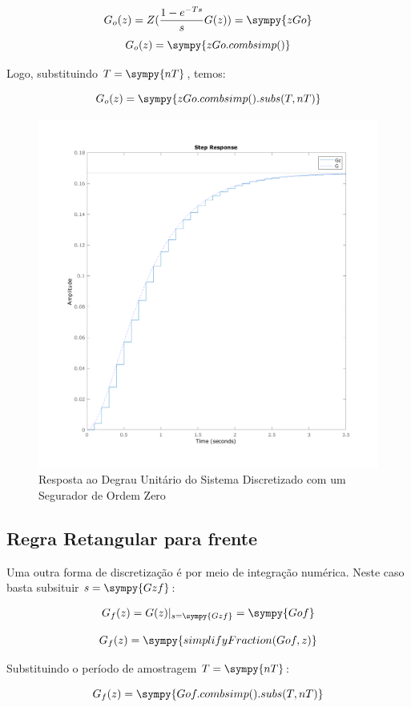 \documentclass[a4paper,11pt]{article}
\begin{document}
$$G_o(z) = Z(\frac{1-e^{-Ts}}{s}G(z)) = \sympy{zGo}$$
$$G_o(z) = \sympy{zGo.combsimp()}$$

Logo, substituindo $T = \sympy{nT}$, temos:

\begin{equation}
  G_o(z) = \sympy{zGo.combsimp().subs(T,nT)}
\end{equation}

\begin{figure}[H]
    \centering
    \includegraphics[width=0.8\linewidth]{img/exsim2-plot-g-zoh.png}
    \caption{Resposta ao Degrau Unitário do Sistema Discretizado com um Segurador de Ordem Zero}
\end{figure}

\subsection{Regra Retangular para frente}

Uma outra forma de discretização é por meio de integração numérica. Neste caso basta subsituir $s = \sympy{Gzf}$:

$$
    G_f(z) =  G(z)|_{s = \sympy{Gzf}} = \sympy{Gof}
$$

$$
    G_f(z) = \sympy{simplifyFraction(Gof,z)}
$$

Substituindo o período de amostragem $T=\sympy{nT}$:

\begin{equation}
    G_f(z) = \sympy{Gof.combsimp().subs(T,nT)}
\end{equation}
\end{document}
